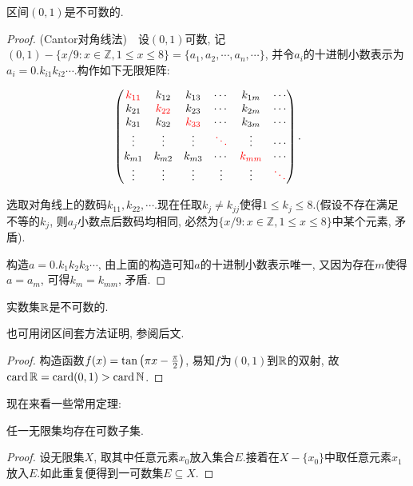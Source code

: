 \begin{proposition}{}
	区间$(0, 1)$是不可数的.
\end{proposition}
\begin{proof}
	(Cantor对角线法)~~设$(0, 1)$可数, 记$(0, 1)-\{ x/9: x \in \mathbb{Z},  1 \leq x \leq 8 \}=\{ a_1,  a_2,  \cdots , a_n , \cdots \}$, 并令$a_i$的十进制小数表示为$a_i=0.k_{i1}k_{i2}\cdots$.构作如下无限矩阵: 
	
	$$\begin{pmatrix}
 \color{red} k_{11} & k_{12} & k_{13} & \cdots & k_{1m} & \cdots \\
 k_{21} & \color{red} k_{22} & k_{23} & \cdots & k_{2m} & \cdots \\
 k_{31} & k_{32} & \color{red} k_{33} & \cdots & k_{3m} & \cdots \\
 \vdots & \vdots & \vdots & \color{red} \ddots & \vdots & \cdots \\
 k_{m1} & k_{m2} & k_{m3} & \cdots & \color{red} k_{mm} & \cdots \\
 \vdots & \vdots & \vdots & \vdots & \vdots & \color{red} \ddots
\end{pmatrix}.$$

	选取对角线上的数码$k_{11}, k_{22}, \cdots $.现在任取$k_j \neq k_{jj}$使得$1 \leq k_j \leq 8$.(假设不存在满足不等的$k_j$, 则$a_j$小数点后数码均相同, 必然为$\{ x/9: x \in \mathbb{Z},  1 \leq x \leq 8 \}$中某个元素, 矛盾).
	
	构造$a=0.k_1k_2k_3\cdots$, 由上面的构造可知$a$的十进制小数表示唯一, 又因为存在$m$使得$a=a_m$, 可得$k_m=k_{mm}$, 矛盾.
\end{proof}

\begin{corollary}{}
	实数集$\mathbb{R}$是不可数的.
\end{corollary}
\begin{remark}
	也可用闭区间套方法证明, 参阅后文. 
\end{remark}
\begin{proof}
	构造函数$f(x)=\tan \left( \pi x-\frac{\pi}{2} \right)$, 易知$f$为$(0, 1)$到$\mathbb{R}$的双射, 故$\operatorname{card} \mathbb{R} = \operatorname{card} (0, 1) > \operatorname{card} \mathbb{N}$.
\end{proof}

现在来看一些常用定理: 

\begin{lemma}{}
	任一无限集均存在可数子集.
\end{lemma}
\begin{proof}
	设无限集$X$, 取其中任意元素$x_0$放入集合$E$.接着在$X-\{ x_0 \}$中取任意元素$x_1$放入$E$.如此重复便得到一可数集$E \subseteq X$.
\end{proof}

